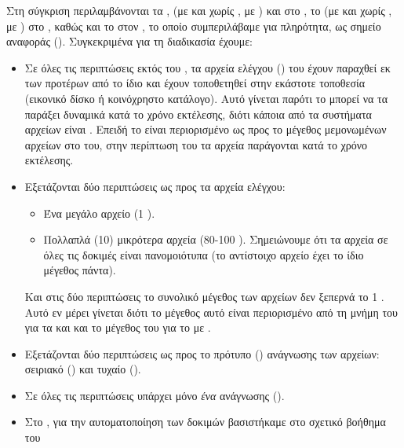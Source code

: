Στη σύγκριση περιλαμβάνονται τα , \viofs{} (με και χωρίς
, με ) και  στο
\osv{}, το \viofs{} (με και χωρίς , με ) στο \linux{}, καθώς και το  στον \host{}, το οποίο
συμπεριλάβαμε για πληρότητα, ως σημείο αναφοράς (). Συγκεκριμένα
για τη διαδικασία έχουμε:
\begin{itemize}
    \item Σε όλες τις περιπτώσεις εκτός του , τα αρχεία ελέγχου
          () του  έχουν παραχθεί εκ των προτέρων από το
          ίδιο και έχουν τοποθετηθεί στην εκάστοτε τοποθεσία (εικονικό δίσκο ή
          κοινόχρηστο κατάλογο). Αυτό γίνεται παρότι το  μπορεί να τα
          παράξει δυναμικά κατά το χρόνο εκτέλεσης, διότι κάποια από τα
          συστήματα αρχείων είναι . Επειδή το  είναι
          περιορισμένο ως προς το μέγεθος μεμονωμένων αρχείων στο 
          του, στην περίπτωση του τα αρχεία παράγονται κατά το χρόνο εκτέλεσης.
    \item Εξετάζονται δύο περιπτώσεις ως προς τα αρχεία ελέγχου:
          \begin{itemize}
              \item Ένα μεγάλο αρχείο (1 ).
              \item Πολλαπλά (10) μικρότερα αρχεία (80-100 ).
                    Σημειώνουμε ότι τα αρχεία σε όλες τις δοκιμές είναι
                    πανομοιότυπα (το αντίστοιχο αρχείο έχει το ίδιο μέγεθος
                    πάντα).
          \end{itemize}
          Και στις δύο περιπτώσεις το συνολικό μέγεθος των αρχείων δεν ξεπερνά
          το 1 . Αυτό εν μέρει γίνεται διότι το μέγεθος αυτό είναι
          περιορισμένο από τη μνήμη του \guest{} για τα  και 
          και το μέγεθος του  για το \viofs{} με .
    \item Εξετάζονται δύο περιπτώσεις ως προς το πρότυπο ()
          ανάγνωσης των αρχείων: σειριακό (\texttt{}) και τυχαίο
          (\texttt{}). %
    \item Σε όλες τις περιπτώσεις υπάρχει μόνο \emph{ένα } ανάγνωσης
          (\texttt{}).
    \item Στο \linux{}, για την αυτοματοποίηση των δοκιμών βασιστήκαμε στο
          σχετικό βοήθημα του %

\end{itemize}
